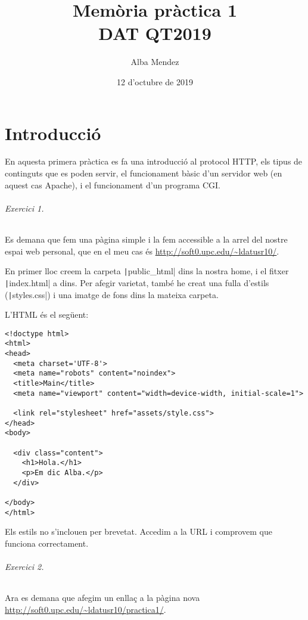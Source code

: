 \documentclass[catalan, a4paper]{scrartcl}
\author{Alba Mendez}
\title{Memòria pràctica 1\\
{\small DAT QT2019}}
\date{12 d'octubre de 2019}
\begin{document}
\maketitle


\part{Introducció}

En aquesta primera pràctica es fa una introducció al protocol HTTP,
els tipus de continguts que es poden servir,
el funcionament bàsic d'un servidor web (en aquest cas Apache), i
el funcionament d'un programa CGI.


\paragraph{Exercici 1.} Es demana que fem una pàgina simple i la fem
accessible a la arrel del nostre espai web personal, que en el meu
cas és \url{http://soft0.upc.edu/~ldatusr10/}.

En primer lloc creem la carpeta \texttt|public_html| dins
la nostra home, i el fitxer \texttt|index.html| a dins. Per
afegir varietat, també he creat una fulla d'estils (\texttt|styles.css|)
i una imatge de fons dins la mateixa carpeta.

L'HTML és el següent:

\begin{verbatim}
<!doctype html>
<html>
<head>
  <meta charset='UTF-8'>
  <meta name="robots" content="noindex">
  <title>Main</title>
  <meta name="viewport" content="width=device-width, initial-scale=1">
  
  <link rel="stylesheet" href="assets/style.css">
</head>
<body>

  <div class="content">
    <h1>Hola.</h1>
    <p>Em dic Alba.</p>
  </div>

</body>
</html>
\end{verbatim}

Els estils no s'inclouen per brevetat. Accedim a la URL i comprovem que
funciona correctament.


\paragraph{Exercici 2.} Ara es demana que afegim un enllaç a la pàgina
nova \url{http://soft0.upc.edu/~ldatusr10/practica1/}.
\end{document}
